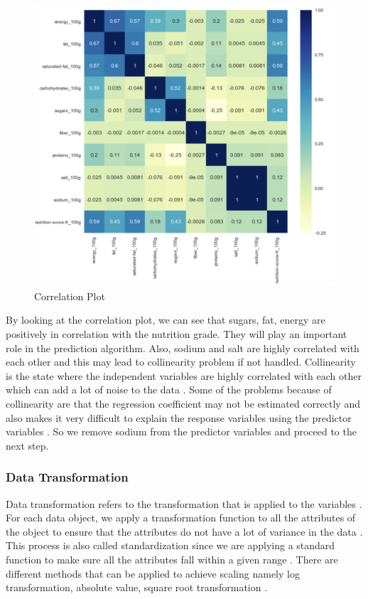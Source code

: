 \documentclass[sigconf]{acmart}
\begin{document}
\begin{figure}
\includegraphics[width=1.0\textwidth]{images/fig3.png}
\caption{Correlation Plot \cite{code-base}}
\label{fig:Fig3}
\end{figure}

By looking at the correlation plot, we can see that sugars, fat, energy are positively in correlation with the nutrition grade. They will play an important role in the prediction algorithm. Also, sodium and salt are highly correlated with each other and this may lead to collinearity problem if not handled. Collinearity is the state where the independent variables are highly correlated with each other which can add a lot of noise to the data \cite{www-coll}. Some of the problems because of collinearity are that the regression coefficient may not be estimated correctly and also makes it very difficult to explain the response variables using the predictor variables \cite{www-coll}. So we remove sodium from the predictor variables and proceed to the next step.

\subsubsection{Data Transformation} 
Data transformation refers to the transformation that is applied to the variables \cite{book-tan}. For each data object, we apply a transformation function to all the attributes of the object to ensure that the attributes do not have a lot of variance in the data \cite{book-tan}. This process is also called standardization since we are applying a standard function to make sure all the attributes fall within a given range \cite{book-tan}. There are different methods that can be applied to achieve scaling namely log transformation, absolute value, square root transformation \cite{book-tan}. \\
\end{document}
